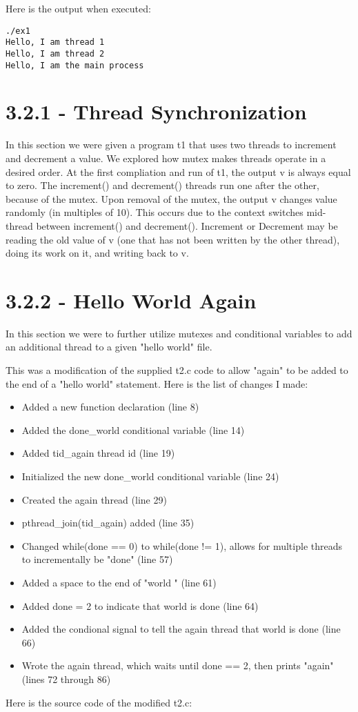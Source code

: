 \documentclass[11pt]{report}
\begin{document}
Here is the output when executed:
\begin{verbatim}
./ex1
Hello, I am thread 1
Hello, I am thread 2
Hello, I am the main process
\end{verbatim}

\newpage
\section*{3.2.1 - Thread Synchronization}
In this section we were given a program t1 that uses two threads to increment and decrement a value. We explored how mutex makes threads operate in a desired order.
\newline
At the first compliation and run of t1, the output v is always equal to zero. The increment() and decrement() threads run one after the other, because of the mutex.
\newline
Upon removal of the mutex, the output v changes value randomly (in multiples of 10). This occurs due to the context switches mid-thread between increment() and decrement(). Increment or Decrement may be reading the old value of v (one that has not been written by the other thread), doing its work on it, and writing back to v.
\newpage
\section*{3.2.2 - Hello World Again}
In this section we were to further utilize mutexes and conditional variables to add an additional thread to a given "hello world" file.
\newline

This was a modification of the supplied t2.c code to allow "again" to be added to the end of a "hello world" statement. Here is the list of changes I made:

\begin{itemize}
\item Added a new function declaration (line 8)
\item Added the done\_world conditional variable (line 14)
\item Added tid\_again thread id (line 19)
\item Initialized the new done\_world conditional variable (line 24)
\item Created the again thread (line 29)
\item pthread\_join(tid\_again) added (line 35)
\item Changed while(done == 0) to while(done != 1), allows for multiple threads to incrementally be "done" (line 57)
\item Added a space to the end of "world " (line 61)
\item Added done = 2 to indicate that world is done (line 64)
\item Added the condional signal to tell the again thread that world is done (line 66)
\item Wrote the again thread, which waits until done == 2, then prints "again" (lines 72 through 86)
\end{itemize}
\newpage
Here is the source code of the modified t2.c:
\end{document}

